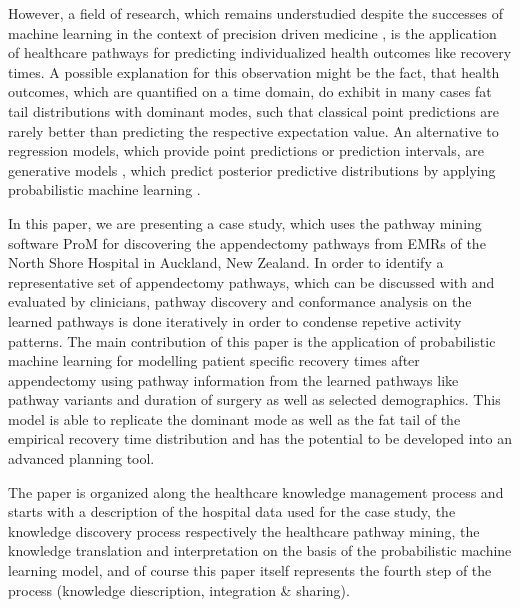 However, a field of research, which remains understudied despite the
successes of machine
learning in the context of precision driven
medicine \cite{AdamAliferis2020_PDM}, is the application of healthcare
pathways for predicting individualized health outcomes like recovery
times.
A possible explanation for this observation might be the fact, that
health outcomes, which are quantified on a time
domain, do exhibit in many cases fat tail distributions with dominant modes,
such that classical point predictions are rarely better than
predicting the respective expectation value. 
An alternative to regression models, which provide point predictions or prediction intervals, are generative models \cite{Bishop2006_ML},
  which predict posterior predictive distributions by applying
  probabilistic machine learning \cite{Ghahramani2015_PML}.
  
  In this paper, we are presenting a case study, which uses the
  pathway mining software ProM for discovering the appendectomy
  pathways from EMRs of the North Shore Hospital in Auckland, New
  Zealand.
  In order to identify a representative set of appendectomy
  pathways, which can be discussed with and evaluated by clinicians,
  pathway discovery and conformance analysis on the learned
  pathways is done iteratively in order to condense repetive activity patterns.
  The main contribution of this paper is the application of 
  probabilistic machine learning for modelling patient specific
  recovery times after appendectomy using pathway information from the
  learned pathways like pathway variants and duration of surgery as well as selected demographics.
  This model is able to replicate the dominant mode as well as the
  fat tail of the empirical recovery time distribution and has the
  potential to be developed into an advanced planning tool.

  The paper is organized along the healthcare knowledge management
  process and starts with a description of the hospital data used for
  the case study,
  the knowledge discovery process respectively the healthcare pathway
  mining, the knowledge translation and interpretation on the basis of
  the probabilistic machine learning model, and of course this paper
  itself represents the fourth step of the process (knowledge
  diescription, integration \& sharing). 
    
  
